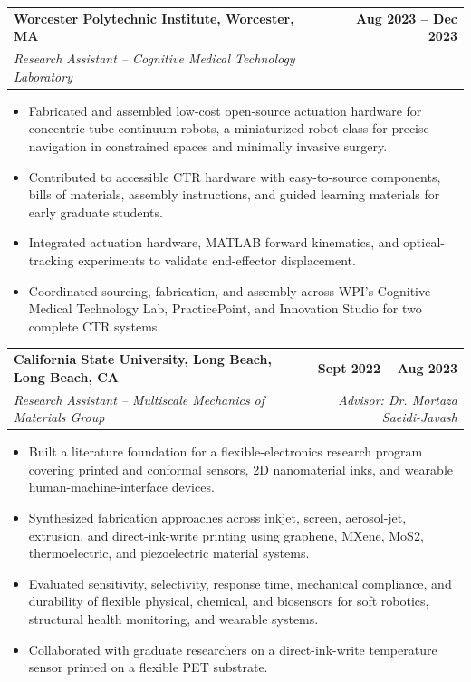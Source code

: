 \documentclass[10pt,letterpaper]{article}
\makeatletter
\newcommand{\roleentry}[4]{%
  \begin{tabularx}{\textwidth}{@{}>{\raggedright\arraybackslash}X r@{}}
    \textbf{#1} & \textbf{#2}\\
    \textit{\textcolor{muted}{#3}} & \textit{\textcolor{muted}{#4}}
  \end{tabularx}
  \vspace{-2pt}
}
\makeatother
\begin{document}
\roleentry{Worcester Polytechnic Institute, Worcester, MA}{Aug 2023 -- Dec 2023}{Research Assistant -- Cognitive Medical Technology Laboratory}{}
\begin{itemize}
  \item Fabricated and assembled low-cost open-source actuation hardware for concentric tube continuum robots, a miniaturized robot class for precise navigation in constrained spaces and minimally invasive surgery.
  \item Contributed to accessible CTR hardware with easy-to-source components, bills of materials, assembly instructions, and guided learning materials for early graduate students.
  \item Integrated actuation hardware, MATLAB forward kinematics, and optical-tracking experiments to validate end-effector displacement.
  \item Coordinated sourcing, fabrication, and assembly across WPI's Cognitive Medical Technology Lab, PracticePoint, and Innovation Studio for two complete CTR systems.
\end{itemize}

\roleentry{California State University, Long Beach, Long Beach, CA}{Sept 2022 -- Aug 2023}{Research Assistant -- Multiscale Mechanics of Materials Group}{Advisor: Dr. Mortaza Saeidi-Javash}
\begin{itemize}
  \item Built a literature foundation for a flexible-electronics research program covering printed and conformal sensors, 2D nanomaterial inks, and wearable human-machine-interface devices.
  \item Synthesized fabrication approaches across inkjet, screen, aerosol-jet, extrusion, and direct-ink-write printing using graphene, MXene, MoS2, thermoelectric, and piezoelectric material systems.
  \item Evaluated sensitivity, selectivity, response time, mechanical compliance, and durability of flexible physical, chemical, and biosensors for soft robotics, structural health monitoring, and wearable systems.
  \item Collaborated with graduate researchers on a direct-ink-write temperature sensor printed on a flexible PET substrate.
\end{itemize}
\end{document}
